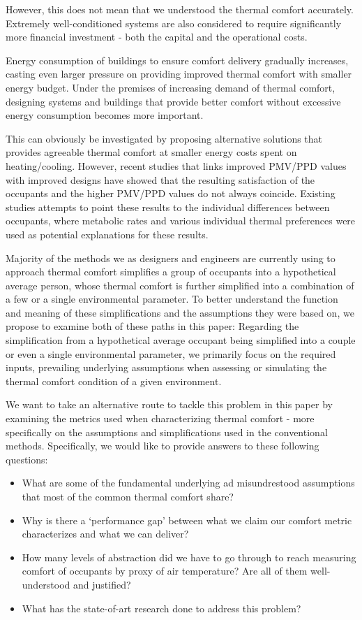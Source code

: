 However, this does not mean that we understood the thermal comfort accurately.
Extremely well-conditioned systems are also considered to require significantly more financial investment - both the capital and the operational costs.

Energy consumption of buildings to ensure comfort delivery gradually increases, casting even larger pressure on providing improved thermal comfort with smaller energy budget. Under the premises of increasing demand of thermal comfort, designing systems and buildings that provide better comfort without excessive energy consumption becomes more important.

This can obviously be investigated by proposing alternative solutions that provides agreeable thermal comfort at smaller energy costs spent on heating/cooling. However, recent studies that links improved PMV/PPD values with improved designs have showed that the resulting satisfaction of the occupants and the higher PMV/PPD values do not always coincide. Existing studies attempts to point these results to the individual differences between occupants, where metabolic rates and various individual thermal preferences were used as potential explanations for these results.

Majority of the methods we as designers and engineers are currently using to approach thermal comfort simplifies a group of occupants into a hypothetical average person, whose thermal comfort is further simplified into a combination of a few or a single environmental parameter. To better understand the function and meaning of these simplifications and the assumptions they were based on, we propose to examine both of these paths in this paper: Regarding the simplification from a hypothetical average occupant being simplified into a couple or even a single environmental parameter, we primarily focus on the required inputs, prevailing underlying assumptions when assessing or simulating the thermal comfort condition of a given environment.

We want to take an alternative route to tackle this problem in this paper by examining the metrics used when characterizing thermal comfort - more specifically on the assumptions and simplifications used in the conventional methods. Specifically, we would like to provide answers to these following questions:

\begin{itemize}
\item What are some of the fundamental underlying ad misundrestood assumptions that most of the common thermal comfort share?
\item Why is there a `performance gap' between what we claim our comfort metric characterizes and what we can deliver?
\item How many levels of abstraction did we have to go through to reach measuring comfort of occupants by proxy of air temperature? Are all of them well-understood and justified?
\item What has the state-of-art research done to address this problem?
\end{itemize}

